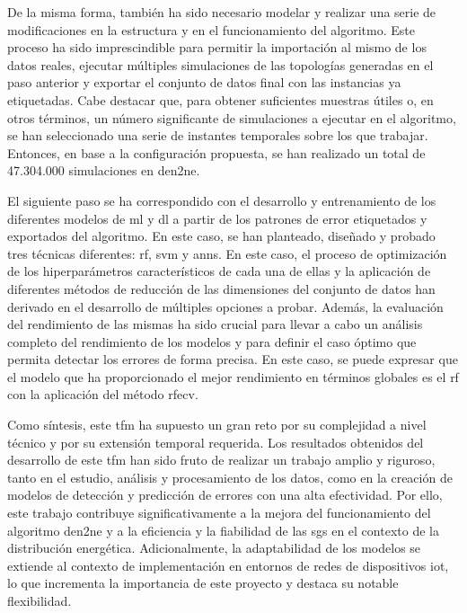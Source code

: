 \vspace{3mm}

De la misma forma, también ha sido necesario modelar y realizar una serie de modificaciones en la estructura y en el funcionamiento del algoritmo. Este proceso ha sido imprescindible para permitir la importación al mismo de los datos reales, ejecutar múltiples simulaciones de las topologías generadas en el paso anterior y exportar el conjunto de datos final con las instancias ya etiquetadas. Cabe destacar que, para obtener suficientes muestras útiles o, en otros términos, un número significante de simulaciones a ejecutar en el algoritmo, se han seleccionado una serie de instantes temporales sobre los que trabajar. Entonces, en base a la configuración propuesta, se han realizado un total de 47.304.000 simulaciones en \gls{den2ne}.

\vspace{3mm}

El siguiente paso se ha correspondido con el desarrollo y entrenamiento de los diferentes modelos de \gls{ml} y \gls{dl} a partir de los patrones de error etiquetados y exportados del algoritmo. En este caso, se han planteado, diseñado y probado tres técnicas diferentes: \gls{rf}, \gls{svm} y \gls{ann}s. En este caso, el proceso de optimización de los hiperparámetros característicos de cada una de ellas y la aplicación de diferentes métodos de reducción de las dimensiones del conjunto de datos han derivado en el desarrollo de múltiples opciones a probar. Además, la evaluación del rendimiento de las mismas ha sido crucial para llevar a cabo un análisis completo del rendimiento de los modelos y para definir el caso óptimo que permita detectar los errores de forma precisa. En este caso, se puede expresar que el modelo que ha proporcionado el mejor rendimiento en términos globales es el \gls{rf} con la aplicación del método \gls{rfecv}.

\vspace{3mm}

Como síntesis, este \gls{tfm} ha supuesto un gran reto por su complejidad a nivel técnico y por su extensión temporal requerida. Los resultados obtenidos del desarrollo de este \gls{tfm} han sido fruto de realizar un trabajo amplio y riguroso, tanto en el estudio, análisis y procesamiento de los datos, como en la creación de modelos de detección y predicción de errores con una alta efectividad. Por ello, este trabajo contribuye significativamente a la mejora del funcionamiento del algoritmo \gls{den2ne} y a la eficiencia y la fiabilidad de las \gls{sg}s en el contexto de la distribución energética. Adicionalmente, la adaptabilidad de los modelos se extiende al contexto de implementación en entornos de redes de dispositivos \gls{iot}, lo que incrementa la importancia de este proyecto y destaca su notable flexibilidad.


